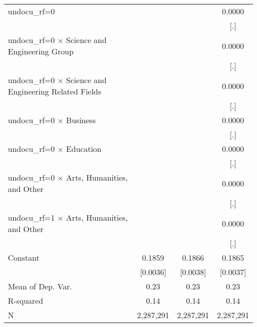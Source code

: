 \begin{table}[htbp]
\begin{tabular}{l*{3}{c}}
\addlinespace
undocu\_rf=0         &                     &                     &      0.0000         \\
                    &                     &                     &         [.]         \\
\addlinespace
undocu\_rf=0 $\times$ Science and Engineering Group&                     &                     &      0.0000         \\
                    &                     &                     &         [.]         \\
\addlinespace
undocu\_rf=0 $\times$ Science and Engineering Related Fields&                     &                     &      0.0000         \\
                    &                     &                     &         [.]         \\
\addlinespace
undocu\_rf=0 $\times$ Business&                     &                     &      0.0000         \\
                    &                     &                     &         [.]         \\
\addlinespace
undocu\_rf=0 $\times$ Education&                     &                     &      0.0000         \\
                    &                     &                     &         [.]         \\
\addlinespace
undocu\_rf=0 $\times$ Arts, Humanities, and Other&                     &                     &      0.0000         \\
                    &                     &                     &         [.]         \\
\addlinespace
undocu\_rf=1 $\times$ Arts, Humanities, and Other&                     &                     &      0.0000         \\
                    &                     &                     &         [.]         \\
\addlinespace
Constant            &      0.1859\sym{***}&      0.1866\sym{***}&      0.1865\sym{***}\\
                    &    [0.0036]         &    [0.0038]         &    [0.0037]         \\
\midrule
Mean of Dep. Var.   &        0.23         &        0.23         &        0.23         \\
R-squared           &        0.14         &        0.14         &        0.14         \\
N                   &   2,287,291         &   2,287,291         &   2,287,291         \\

\end{tabular}
\end{table}
